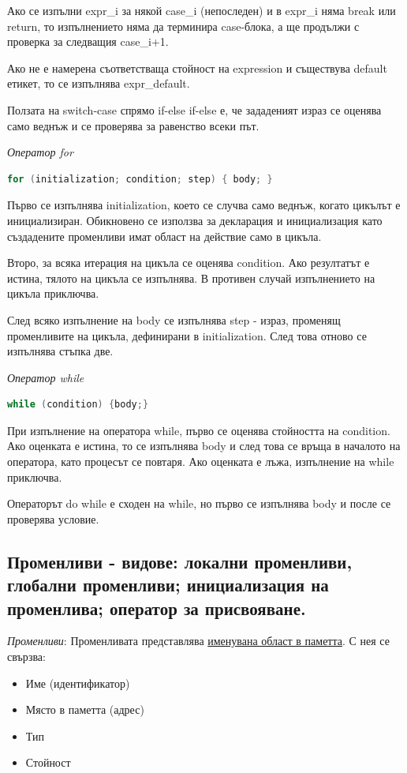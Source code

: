 \documentclass{article}
\renewcommand{\\}{\newline}
\begin{document}
Ако се изпълни expr\_i за някой case\_i (непоследен) и в expr\_i няма break или return, то изпълнението няма да терминира case-блока, а ще продължи с проверка за следващия case\_i+1.

Ако не е намерена съответстваща стойност на expression и съществува default етикет, то се изпълнява expr\_default.

Ползата на switch-case спрямо if-else if-else е, че зададеният израз се оценява само веднъж и се проверява за равенство всеки път.

\textit{Оператор for}

\begin{lstlisting}[language=C++]
  for (initialization; condition; step) { body; }
\end{lstlisting}

Първо се изпълнява initialization, което се случва само веднъж, когато цикълът е инициализиран. Обикновено се използва за декларация и инициализация като създадените променливи имат област на действие само в цикъла. 

Второ, за всяка итерация на цикъла се оценява condition. Ако резултатът е истина, тялото на цикъла се изпълнява. В противен случай изпълнението на цикъла приключва.

След всяко изпълнение на body се изпълнява step - израз, променящ променливите на цикъла, дефинирани в initialization. След това отново се изпълнява стъпка две.

\textit{Оператор while}

\begin{lstlisting}[language=C++]
  while (condition) {body;}
\end{lstlisting}

При изпълнение на оператора while, първо се оценява стойността на condition. Ако оценката е истина, то се изпълнява body и след това се връща в началото на оператора, като процесът се повтаря. Ако оценката е лъжа, изпълнение на while приключва.

Операторът do while е сходен на while, но първо се изпълнява body и после се проверява условие.

\subsection{Променливи - видове: локални променливи, глобални променливи; инициализация на променлива; оператор за присвояване.}

\textit{Променливи}: Променливата представлява \underline{именувана област в паметта}. С нея се свързва: \begin{itemize}
    \item Име (идентификатор)
    \item Място в паметта (адрес)
    \item Тип
    \item Стойност
\end{itemize}
\end{document}
